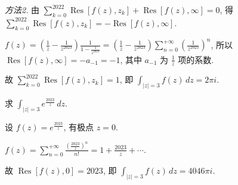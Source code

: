 \documentclass{homework}
\DeclareMathOperator\Res{Res}
\begin{document}
\textit{方法2.} 由 \(\sum_{k=0}^{2022}\Res[f(z), z_k]+\Res[f(z), \infty]=0\), 得 \(\sum_{k=0}^{2022}\Res[f(z), z_k]=-\Res[f(z), \infty]\).

\(f(z)=(\frac{1}{z}-\frac{1}{z^{2023}})\frac{1}{1-\frac{1}{z^{2023}}}=(\frac{1}{z}-\frac{1}{z^{2023}})\sum_{n=0}^{+\infty}(\frac{1}{z^{2023}})^n\), 所以 \(\Res[f(z), \infty]=-a_{-1}=-1\), 其中 \(a_{-1}\) 为 \(\frac{1}{z}\) 项的系数.

故 \(\sum_{k=0}^{2022}\Res[f(z), z_k]=1\), 即 \(\int_{|z|=3}f(z)\,dz=2\pi i\).

求 \(\int_{|z|=3}e^{\frac{2023}{z}}\,dz\).

设 \(f(z)=e^{\frac{2023}{z}}\), 有极点 \(z=0\).

\(f(z)=\sum_{n=0}^{+\infty}\frac{(\frac{2023}{z})^n}{n!}=1+\frac{2023}{z}+\cdots\).

故 \(\Res[f(z), 0]=2023\), 即 \(\int_{|z|=3}f(z)\,dz=4046\pi i\).
\end{document}
